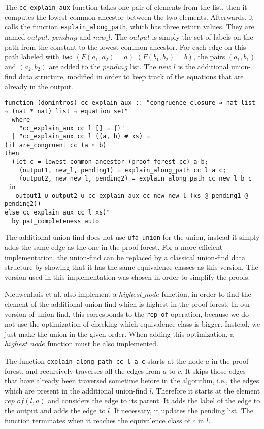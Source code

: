 The \lstinline{cc_explain_aux} function takes one pair of elements from the list, then it
computes the lowest common ancestor between the two elements.
Afterwards, it calls the function \lstinline{explain_along_path}, which has three return values. They are named $output$, $pending$ and $new\_l$.
The $output$ is simply the set of labels on the path from the constant to the lowest common ancestor. For each edge on this path labeled with \lstinline|Two| $(F(a_1, a_2) = a)$ $(F(b_1, b_2) = b)$, the pairs $(a_1, b_1)$ and $(a_2, b_2)$ are added to the $pending$ list. The $new\_l$ is the additional union-find data structure, modified in order to keep track of the equations that are already in the output.

\begin{lstlisting}
function (domintros) cc_explain_aux :: "congruence_closure ⇒ nat list ⇒ (nat * nat) list ⇒ equation set"
  where
    "cc_explain_aux cc l [] = {}"
  | "cc_explain_aux cc l ((a, b) # xs) =
(if are_congruent cc (a ≈ b)
then
  (let c = lowest_common_ancestor (proof_forest cc) a b;
    (output1, new_l, pending1) = explain_along_path cc l a c;
    (output2, new_new_l, pending2) = explain_along_path cc new_l b c
 in
   output1 ∪ output2 ∪ cc_explain_aux cc new_new_l (xs @ pending1 @ pending2))
else cc_explain_aux cc l xs)"
  by pat_completeness auto
\end{lstlisting}

The additional union-find does not use \lstinline{ufa_union} for the union, instead it simply adds the same edge as the one in the proof forest.
For a more efficient implementation, the union-find can be replaced by a classical union-find data structure by showing that it has the same equivalence classes as this version.
The version used in this implementation was chosen in order to simplify the proofs.

Nieuwenhuis et al. \cite{Nieuwenhuis} also implement a $highest\_node$ function, in order to find the element of the additional union-find which is highest in the proof forest.
In our version of union-find, this corresponds to the \lstinline{rep_of} operation, because we do not use the optimization of checking which equivalence class is bigger. Instead, we just make the union in the given order. When adding this optimization, a $highest\_node$ function must be also implemented.

The function \lstinline{explain_along_path cc l a c} starts at the node $a$ in the proof forest, and recursively traverses all the edges from $a$ to $c$. It skips those edges that have already been traversed sometime before in the algorithm, i.e., the edges which are present in the additional union-find $l$. Therefore it starts at the element $rep\_of(l, a)$ and considers the edge to its parent. It adds the label of the edge to the output and adds the edge to $l$. If necessary, it updates the pending list. The function terminates when it reaches the equivalence class of $c$ in $l$.

